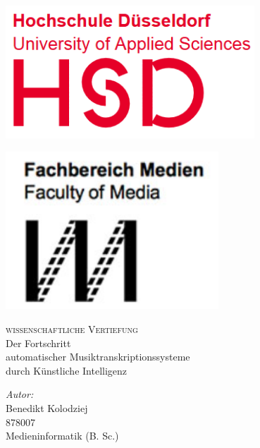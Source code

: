 \begin{titlepage}
    \thispagestyle{empty}

    \vspace*{1cm} %
    \begin{minipage}{0.45\textwidth}
        \raggedright
        \includegraphics[width=0.7\textwidth]{Graphics/HSDLogo} %
    \end{minipage}%
    \hfill
    \begin{minipage}{0.45\textwidth}
        \raggedleft
        \includegraphics[width=0.6\textwidth]{Graphics/FacultyOfMedia} %
    \end{minipage}

    \vspace{1.5cm} %

    \center

    \textsc{\Large wissenschaftliche Vertiefung}\\[2cm]

    \huge{Der Fortschritt}\\[0.2cm]
    \huge{automatischer Musiktranskriptionssysteme}\\[0.2cm]
    \huge{durch Künstliche Intelligenz}\\[2cm]
    \Large

    \begin{center}
        \textit{Autor:} \\
        Benedikt Kolodziej \\
        878007 \\
        Medieninformatik (B. Sc.) \\[1cm]


\end{center}
\end{titlepage}
